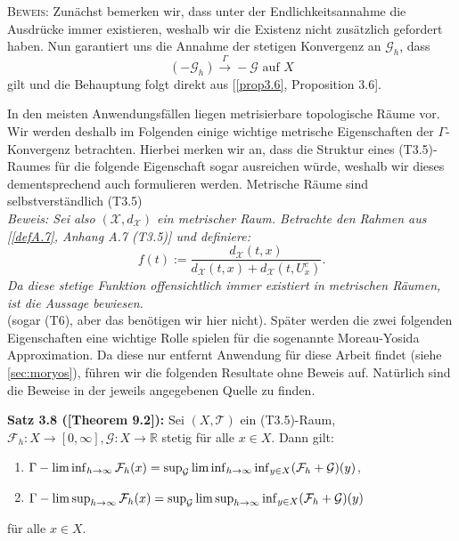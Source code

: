 \textsc{Beweis:} Zunächst bemerken wir, dass unter der Endlichkeitsannahme die Ausdrücke immer existieren, weshalb wir die Existenz nicht zusätzlich gefordert haben. Nun garantiert uns die Annahme der stetigen Konvergenz an \(\mathcal{G}_h\), dass
\begin{equation}
    (-\mathcal{G}_h) \stackrel{\Gamma}{\to} -\mathcal{G} \text{ auf }X
\end{equation}
gilt und die Behauptung folgt direkt aus [\ref{prop3.6}, Proposition 3.6]. \QEDB

In den meisten Anwendungsfällen liegen metrisierbare topologische Räume vor. Wir werden deshalb im Folgenden einige wichtige metrische Eigenschaften der \(\Gamma\)-Konvergenz betrachten. Hierbei merken wir an, dass die Struktur eines (T3.5)-Raumes für die folgende Eigenschaft sogar ausreichen würde, weshalb wir dieses dementsprechend auch formulieren werden. Metrische Räume sind selbstverständlich (T3.5) \\
\textit{Beweis: Sei also \((\mathcal{X},d_{\mathcal{X}})\) ein metrischer Raum. Betrachte den Rahmen aus [\ref{defA.7}, Anhang A.7 (T3.5)] und definiere:
\begin{equation}
    f(t) := \frac{d_{\mathcal{X}}(t,x)}{d_{\mathcal{X}}(t,x) + d_{\mathcal{X}}(t,U^c_x)}.
\end{equation}
Da diese stetige Funktion offensichtlich immer existiert in metrischen Räumen, ist die Aussage bewiesen. \QEDB}\\
(sogar (T6), aber das benötigen wir hier nicht).
Später werden die zwei folgenden Eigenschaften eine wichtige Rolle spielen für die sogenannte Moreau-Yosida Approximation. Da diese nur entfernt Anwendung für diese Arbeit findet (siehe \ref{sec:moryos}), führen wir die folgenden Resultate ohne Beweis auf. Natürlich sind die Beweise in der jeweils angegebenen Quelle zu finden.\\[0.5cm]
\colorbox{generalYellow}{\begin{minipage}{16cm}{\textcolor{black}{}{\label{theo3.8}}}
\textbf{Satz 3.8 (\cite{MasoGamma}[Theorem 9.2]):} Sei \((X,\mathcal{T})\) ein (T3.5)-Raum, \(\mathcal{F}_h : X \to [0,\infty], \mathcal{G} : X \to \mathbb{R}\) stetig für alle \(x \in X\). Dann gilt:
\begin{enumerate}
    \item \(\Gamma - \liminf_{h \to \infty} \mathcal{F}_h(x) = \sup_{\mathcal{G}} \liminf_{h \to \infty} \inf_{y \in X} (\mathcal{F}_h + \mathcal{G})(y)\),
    \item \(\Gamma - \limsup_{h \to \infty} \mathcal{F}_h(x) = \sup_{\mathcal{G}} \limsup_{h \to \infty} \inf_{y \in X} (\mathcal{F}_h + \mathcal{G})(y)\)
\end{enumerate}
für alle \(x \in X\).
\end{minipage}}\\

